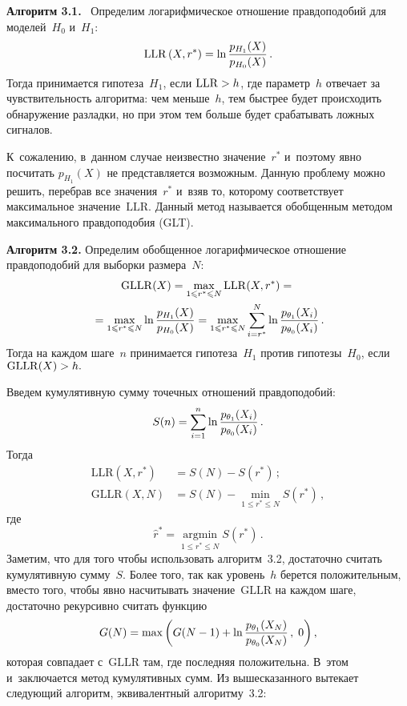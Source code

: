 \begin{multicols}{2}
\noindent
\textbf{Алгоритм 3.1.}\ %
 Определим логарифмическое отношение правдоподобий для моделей~$H_0$ и~$H_1$: 
\begin{equation*}
\mathrm{LLR} \left(X, r^*\right) = 
\ln\displaystyle\frac{\displaystyle p_{H_1}(X)\mathstrut}{\displaystyle p_{H_0}(X)\mathstrut}\,.
\end{equation*} 
Тогда  принимается гипотеза~$H_1$, если $\mathrm{LLR} \hm>h$, где параметр~$h$  
отвечает за чувствительность 
алгоритма: чем меньше~$h$, тем быстрее будет происходить обнаружение разладки, 
но при этом тем больше будет срабатывать ложных сигналов.

\smallskip

К~сожалению,  в~данном случае неизвестно значение~$r^*$ и~поэтому явно посчитать 
$p_{H_1}(X)$ не представляется возможным. Данную проблему можно решить, перебрав 
все значения~$r^*$ и~взяв то, которому соответствует максимальное значение~$\mathrm{LLR}$. 
Данный метод называется обобщенным методом максимального 
правдоподобия (GLT).


\smallskip

\noindent
\textbf{Алгоритм 3.2.} %
Определим обобщенное логарифмическое отношение 
правдоподобий для выборки размера~$N$: 
\begin{multline*}
\mathrm{GLLR}(X) =\max\limits_{1   \leqslant r^* \leqslant N } 
\mathrm{LLR}(X, r^*)  ={}\\
{}=\max\limits_{1  \leqslant r^* \leqslant N } 
\ln\displaystyle\frac{\displaystyle p_{H_1}(X)\mathstrut}{\displaystyle p_{H_0}(X)\mathstrut}  =\max\limits_{1  \leqslant r^* \leqslant N } 
\sum\limits_{i = r^*}^N \ln \displaystyle\frac{\displaystyle p_{\theta_1}(X_i)\mathstrut}{\displaystyle p_{\theta_0}(X_i)\mathstrut}\,. 
\end{multline*}
Тогда на каждом шаге~$n$ принимается гипотеза~$H_1$  против гипотезы~$H_0$, если 
$\mathrm{GLLR}(X)\hm>h.$

\smallskip

Введем  кумулятивную сумму точечных отношений правдоподобий:
\begin{equation*}
S(n) = \sum\limits_{i = 1}^n \ln  
\displaystyle\frac{\displaystyle p_{\theta_1}(X_i)\mathstrut}{\displaystyle p_{\theta_0}(X_i)\mathstrut}\,. 
\end{equation*}
Тогда 
\begin{align*}
\mathrm{LLR} (X, r^*) &= S(N) - S(r^*)\,; \\
\mathrm{GLLR}(X, N) &= S(N) - \min\limits_{1  \leqslant r^* \leqslant N  }S(r^*)\,,
\end{align*}
где
$$
\hat{r}^* = \mathop{\mathrm{argmin}}\limits_{1  \leqslant r^* \leqslant N}S(r^*)\,.
$$
Заметим, что для того чтобы использовать алгоритм~3.2, достаточно 
считать кумулятивную сумму~$S$. Более того, так как уровень~$h$ берется 
положительным, вместо того, чтобы явно насчитывать значение~$\mathrm{GLLR}$ на 
каждом шаге, достаточно рекурсивно считать функцию 
\begin{equation*}
 G(N)  =\max\left(G(N- 1) +\ln \displaystyle\frac{\displaystyle p_{\theta_1}(X_N)\mathstrut}{\displaystyle p_{\theta_0}(X_N)\mathstrut}\,, 
\;0\right),
\end{equation*}
которая совпадает с~$\mathrm{GLLR}$ там, где последняя положительна. В~этом 
и~заключается метод кумулятивных сумм. Из вышесказанного вытекает следующий 
алгоритм, эквивалентный алгоритму~3.2:


\end{multicols}
